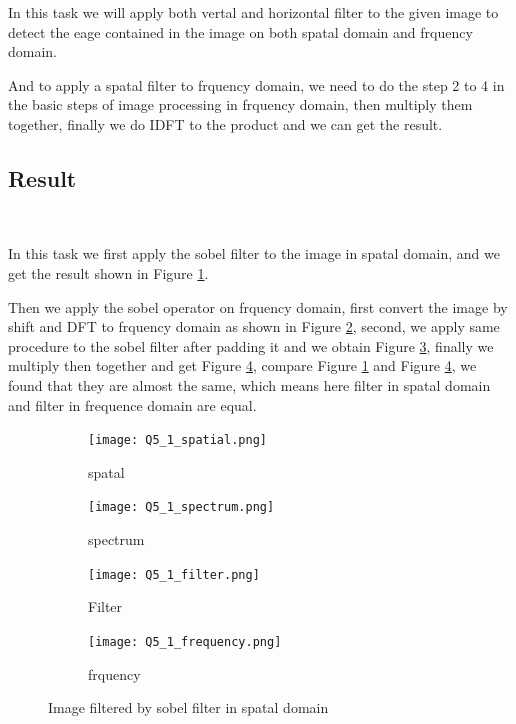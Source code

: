 \documentclass[
	12pt, %
]{style/fphw}
\begin{document}
In this task we will apply both vertal and horizontal filter to the given image to detect the eage contained in the image on both spatal domain and frquency domain.

And to apply a spatal filter to frquency domain, we need to do the step 2 to 4 in the basic steps of image processing in frquency domain, then multiply them together, finally we do IDFT to the product and we can get the result.

\subsection*{Result} \

In this task we first apply the sobel filter to the image in spatal domain, and we get the result shown in Figure \ref{Q5_1_spatial.png}.

Then we apply the sobel operator on frquency domain, first convert the image by shift and DFT to frquency domain as shown in Figure \ref{Q5_1_spectrum.png}, second, we apply same procedure to the sobel filter after padding it and we obtain Figure \ref{Q5_1_filter.png}, finally we multiply then together and get Figure \ref{Q5_1_frequency.png}, compare Figure \ref{Q5_1_spatial.png} and Figure \ref{Q5_1_frequency.png}, we found that they are almost the same, which means here filter in spatal domain and filter in frequence domain are equal.
 
\begin{figure}[H]
     \centering
     \begin{subfigure}[b]{0.45\textwidth}
         \centering
         \texttt{[image: Q5\_1\_spatial.png]}
         \caption{spatal}
         \label{Q5_1_spatial.png}
     \end{subfigure}
     \hfill
         \begin{subfigure}[b]{0.45\textwidth}
         \centering
         \texttt{[image: Q5\_1\_spectrum.png]}
         \caption{spectrum}
         \label{Q5_1_spectrum.png}
     \end{subfigure}
     \vfill
     \begin{subfigure}[b]{0.45\textwidth}
         \centering
         \texttt{[image: Q5\_1\_filter.png]}
         \caption{Filter}
         \label{Q5_1_filter.png}
     \end{subfigure}
     \hfill
     \begin{subfigure}[b]{0.45\textwidth}
         \centering
         \texttt{[image: Q5\_1\_frequency.png]}
         \caption{frquency}
         \label{Q5_1_frequency.png}
     \end{subfigure}
        \caption{Image filtered by sobel filter in spatal domain}
        \label{sobel filter spatal}
\end{figure}
\end{document}
